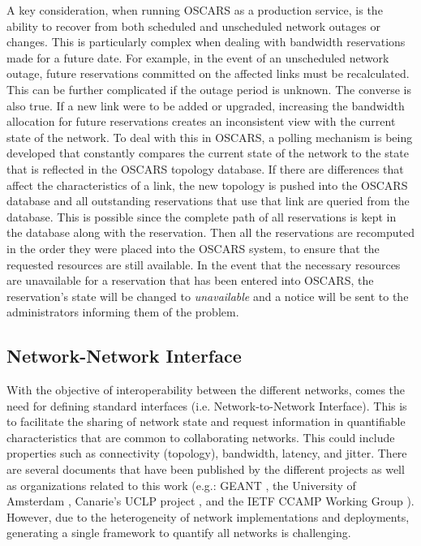 \documentclass[conference]{IEEEtran}
\begin{document}
A key consideration, when running OSCARS as a production service, is the ability
to recover from both scheduled and unscheduled network outages or changes.  This
is particularly complex when dealing with bandwidth reservations made for a
future date.  For example, in the event of an unscheduled network outage, future
reservations committed on the affected links must be recalculated. This can be
further complicated if the outage period is unknown.  The converse is also true.
If a new link were to be added or upgraded, increasing the bandwidth allocation
for future reservations creates an inconsistent view with the current state of
the network.  To deal with this in OSCARS,
a polling mechanism is being developed that constantly
compares the current state of the network to the state that is reflected in the
OSCARS topology database. If there are differences that affect the
characteristics of a link, the new topology is pushed into the OSCARS database
and all outstanding reservations that use that link are queried from the
database. This is possible since the complete path of all reservations is kept
in the database along with the reservation. Then all the reservations are
recomputed in the order they were placed into the OSCARS system, to ensure that
the requested resources are still available.  In the event that the necessary
resources are unavailable for a reservation that has been entered into OSCARS,
the reservation's state will be changed to \emph{unavailable} and a notice will be
sent to the administrators informing them of the problem.

\subsection{Network-Network Interface}
With the objective of interoperability between the different networks,
comes the need for defining standard interfaces (i.e. Network-to-Network
Interface).  This is to facilitate the sharing of network state and
request information in quantifiable characteristics that are common to
collaborating networks.  This could include properties such as connectivity
(topology), bandwidth, latency, and jitter.  There are several documents
that have been published by the different projects as well as organizations
related to this work (e.g.: GEANT \cite{GEANT}, the University of Amsterdam 
\cite{ndl}, Canarie's UCLP project \cite{canarie-interop}, and the IETF CCAMP 
Working Group \cite{ietf-ccamp}).  However, due to the
heterogeneity of network implementations and deployments, generating a single
framework to quantify all networks is challenging.
\end{document}
